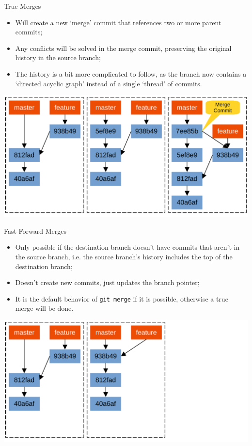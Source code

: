 \documentclass{beamer}
\begin{document}
\begin{frame}{True Merges}
  \begin{itemize}
    \item Will create a new `merge' commit that references two or more parent commits;
    \item Any conflicts will be solved in the merge commit, preserving the original history in the source branch;
    \item The history is a bit more complicated to follow, as the branch now contains a `directed acyclic graph' instead of a single `thread' of commits.
  \end{itemize}
  \begin{center}
    \includegraphics[scale=0.5]{git-true-merge}
  \end{center}
\end{frame}

\begin{frame}{Fast Forward Merges}
  \begin{itemize}
    \item Only possible if the destination branch doesn't have commits that aren't in the source branch, i.e. the source branch's history includes the top of the destination branch;
    \item Doesn't create new commits, just updates the branch pointer;
    \item It is the default behavior of \texttt{git merge} if it is possible, otherwise a true merge will be done.
  \end{itemize}
  \begin{center}
    \includegraphics[scale=0.5]{git-fast-forward-merge}
  \end{center}
\end{frame}
\end{document}
